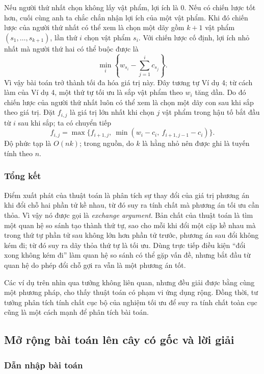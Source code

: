 \documentclass[11pt]{article}
\begin{document}
Nếu người thứ nhất chọn không lấy vật phẩm, lợi ích là $0$. Nếu có chiến lược
tốt hơn, cuối cùng anh ta chắc chắn nhận lợi ích của một vật phẩm. Khi đó chiến
lược của người thứ nhất có thể xem là chọn một dãy gồm $k+1$ vật phẩm
$(s_1,\ldots,s_{k+1})$, lần thứ $i$ chọn vật phẩm $s_i$. Với chiến lược cố định,
lợi ích nhỏ nhất mà người thứ hai có thể buộc được là
\[
  \min_i\left\{w_{s_i}-\sum_{j=1}^i c_{s_j}\right\}.
\]
Vì vậy bài toán trở thành tối đa hóa giá trị này. Đây tương tự Ví dụ 4; từ cách
làm của Ví dụ 4, một thứ tự tối ưu là sắp vật phẩm theo $w_i$ tăng dần. Do đó
chiến lược của người thứ nhất luôn có thể xem là chọn một dãy con sau khi sắp
theo giá trị. Đặt $f_{i,j}$ là giá trị lớn nhất khi chọn $j$ vật phẩm trong hậu
tố bắt đầu từ $i$ sau khi sắp; ta có chuyển tiếp
\[
  f_{i,j}=\max\{f_{i+1,j},\ \min(w_i-c_i,\ f_{i+1,j-1}-c_i)\}.
\]
Độ phức tạp là $O(nk)$; trong nguồn, do $k$ là hằng nhỏ nên được ghi là tuyến
tính theo $n$.

\subsubsection{Tổng kết}

Điểm xuất phát của thuật toán là phân tích sự thay đổi của giá trị phương án
khi đổi chỗ hai phần tử kề nhau, từ đó suy ra tính chất mà phương án tối ưu cần
thỏa. Vì vậy nó được gọi là \emph{exchange argument}. Bản chất của thuật toán là
tìm một quan hệ so sánh tạo thành thứ tự, sao cho mỗi khi đổi một cặp kề nhau
mà trong thứ tự phần tử sau không lớn hơn phần tử trước, phương án sau đổi không
kém đi; từ đó suy ra dãy thỏa thứ tự là tối ưu. Dùng trực tiếp điều kiện
``đổi xong không kém đi'' làm quan hệ so sánh có thể gặp vấn đề, nhưng bắt đầu
từ quan hệ do phép đổi chỗ gợi ra vẫn là một phương án tốt.

Các ví dụ trên nhìn qua tưởng không liên quan, nhưng đều giải được bằng cùng
một phương pháp, cho thấy thuật toán có phạm vi ứng dụng rộng. Đồng thời, tư
tưởng phân tích tính chất cục bộ của nghiệm tối ưu để suy ra tính chất toàn cục
cũng là một cách mạnh để phân tích bài toán.

\subsection{Mở rộng bài toán lên cây có gốc và lời giải}

\subsubsection{Dẫn nhập bài toán}
\end{document}
